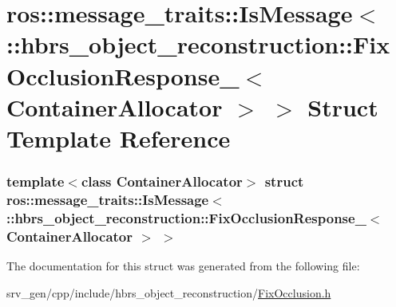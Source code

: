 \hypertarget{structros_1_1message__traits_1_1_is_message_3_01_1_1hbrs__object__reconstruction_1_1_fix_occlusia33e907b44b81b8b61374e1ed374fdc9}{\section{ros\-:\-:message\-\_\-traits\-:\-:\-Is\-Message$<$ \-:\-:hbrs\-\_\-object\-\_\-reconstruction\-:\-:\-Fix\-Occlusion\-Response\-\_\-$<$ \-Container\-Allocator $>$ $>$ \-Struct \-Template \-Reference}
\label{structros_1_1message__traits_1_1_is_message_3_01_1_1hbrs__object__reconstruction_1_1_fix_occlusia33e907b44b81b8b61374e1ed374fdc9}
}
\subsubsection*{template$<$class Container\-Allocator$>$ struct ros\-::message\-\_\-traits\-::\-Is\-Message$<$ \-::hbrs\-\_\-object\-\_\-reconstruction\-::\-Fix\-Occlusion\-Response\-\_\-$<$ Container\-Allocator $>$ $>$}



\-The documentation for this struct was generated from the following file\-:\begin{DoxyCompactItemize}
\item 
srv\-\_\-gen/cpp/include/hbrs\-\_\-object\-\_\-reconstruction/\hyperlink{_fix_occlusion_8h}{\-Fix\-Occlusion.\-h}\end{DoxyCompactItemize}

